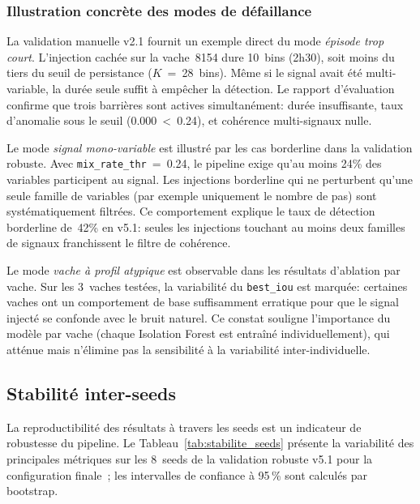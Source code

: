 \subsubsection{Illustration concrète des modes de défaillance}

La validation manuelle v2.1 fournit un exemple direct du mode \textit{épisode trop court}.
L'injection cachée sur la vache~8154 dure 10~bins (2h30), soit moins du tiers du seuil
de persistance ($K$~=~28~bins). Même si le signal avait été multi-variable, la durée
seule suffit à empêcher la détection. Le rapport d'évaluation confirme que trois
barrières sont actives simultanément: durée insuffisante, taux d'anomalie sous le
seuil (0.000~<~0.24), et cohérence multi-signaux nulle.

Le mode \textit{signal mono-variable} est illustré par les cas borderline
dans la validation robuste. Avec \texttt{mix\_rate\_thr}~=~0.24, le pipeline exige
qu'au moins 24\% des variables participent au signal. Les injections borderline
qui ne perturbent qu'une seule famille de variables (par exemple uniquement le nombre
de pas) sont systématiquement filtrées. Ce comportement explique le taux de détection
borderline de~42\% en v5.1: seules les injections touchant au moins deux
familles de signaux franchissent le filtre de cohérence.

Le mode \textit{vache à profil atypique} est observable dans les résultats d'ablation
par vache. Sur les 3~vaches testées, la variabilité du \texttt{best\_iou} est marquée:
certaines vaches ont un comportement de base suffisamment erratique pour que le signal
injecté se confonde avec le bruit naturel. Ce constat souligne l'importance du modèle
par vache (chaque Isolation Forest est entraîné individuellement), qui atténue mais
n'élimine pas la sensibilité à la variabilité inter-individuelle.

\subsection{Stabilité inter-seeds}

La reproductibilité des résultats à travers les seeds est un indicateur de robustesse
du pipeline. Le Tableau~\ref{tab:stabilite_seeds} présente la variabilité des principales
métriques sur les 8~seeds de la validation robuste v5.1 pour la configuration finale~;
les intervalles de confiance à 95\,\% sont calculés par bootstrap.

